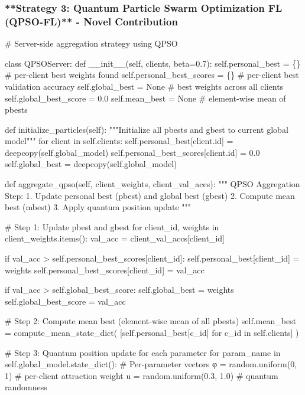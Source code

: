 \subsubsection{**Strategy 3: Quantum Particle Swarm Optimization FL (QPSO-FL)** - Novel Contribution}
\# Server-side aggregation strategy using QPSO

class QPSOServer:
    def \_\_init\_\_(self, clients, beta=0.7):
        self.personal\_best = \{\}        \# per-client best weights found
        self.personal\_best\_scores = \{\} \# per-client best validation accuracy
        self.global\_best = None        \# best weights across all clients
        self.global\_best\_score = 0.0
        self.mean\_best = None          \# element-wise mean of pbests
        
    def initialize\_particles(self):
        """Initialize all pbests and gbest to current global model"""
        for client in self.clients:
            self.personal\_best[client.id] = deepcopy(self.global\_model)
            self.personal\_best\_scores[client.id] = 0.0
        self.global\_best = deepcopy(self.global\_model)
    
    def aggregate\_qpso(self, client\_weights, client\_val\_accs):
        """
        QPSO Aggregation Step:
        1. Update personal best (pbest) and global best (gbest)
        2. Compute mean best (mbest)
        3. Apply quantum position update
        """
        
        \# Step 1: Update pbest and gbest
        for client\_id, weights in client\_weights.items():
            val\_acc = client\_val\_accs[client\_id]
            
            if val\_acc > self.personal\_best\_scores[client\_id]:
                self.personal\_best[client\_id] = weights
                self.personal\_best\_scores[client\_id] = val\_acc
            
            if val\_acc > self.global\_best\_score:
                self.global\_best = weights
                self.global\_best\_score = val\_acc
        
        \# Step 2: Compute mean best (element-wise mean of all pbests)
        self.mean\_best = compute\_mean\_state\_dict(
            [self.personal\_best[c\_id] for c\_id in self.clients]
        )
        
        \# Step 3: Quantum position update for each parameter
        for param\_name in self.global\_model.state\_dict():
            \# Per-parameter vectors
            φ = random.uniform(0, 1)  \# per-client attraction weight
            u = random.uniform(0.3, 1.0)  \# quantum randomness
            
